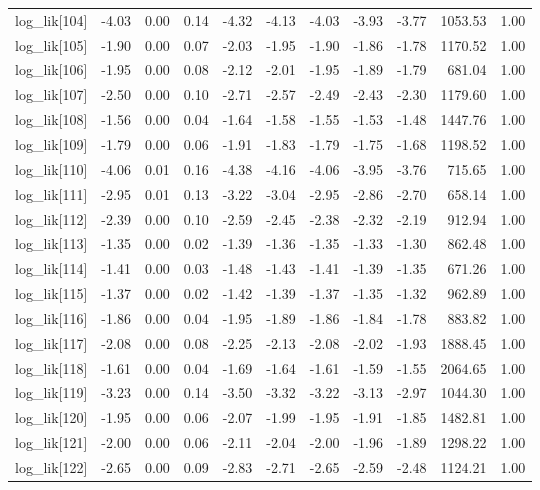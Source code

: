 \begin{table}[ht]
\begin{tabular}{rrrrrrrrrrr}
  log\_lik[104] & -4.03 & 0.00 & 0.14 & -4.32 & -4.13 & -4.03 & -3.93 & -3.77 & 1053.53 & 1.00 \\ 
  log\_lik[105] & -1.90 & 0.00 & 0.07 & -2.03 & -1.95 & -1.90 & -1.86 & -1.78 & 1170.52 & 1.00 \\ 
  log\_lik[106] & -1.95 & 0.00 & 0.08 & -2.12 & -2.01 & -1.95 & -1.89 & -1.79 & 681.04 & 1.00 \\ 
  log\_lik[107] & -2.50 & 0.00 & 0.10 & -2.71 & -2.57 & -2.49 & -2.43 & -2.30 & 1179.60 & 1.00 \\ 
  log\_lik[108] & -1.56 & 0.00 & 0.04 & -1.64 & -1.58 & -1.55 & -1.53 & -1.48 & 1447.76 & 1.00 \\ 
  log\_lik[109] & -1.79 & 0.00 & 0.06 & -1.91 & -1.83 & -1.79 & -1.75 & -1.68 & 1198.52 & 1.00 \\ 
  log\_lik[110] & -4.06 & 0.01 & 0.16 & -4.38 & -4.16 & -4.06 & -3.95 & -3.76 & 715.65 & 1.00 \\ 
  log\_lik[111] & -2.95 & 0.01 & 0.13 & -3.22 & -3.04 & -2.95 & -2.86 & -2.70 & 658.14 & 1.00 \\ 
  log\_lik[112] & -2.39 & 0.00 & 0.10 & -2.59 & -2.45 & -2.38 & -2.32 & -2.19 & 912.94 & 1.00 \\ 
  log\_lik[113] & -1.35 & 0.00 & 0.02 & -1.39 & -1.36 & -1.35 & -1.33 & -1.30 & 862.48 & 1.00 \\ 
  log\_lik[114] & -1.41 & 0.00 & 0.03 & -1.48 & -1.43 & -1.41 & -1.39 & -1.35 & 671.26 & 1.00 \\ 
  log\_lik[115] & -1.37 & 0.00 & 0.02 & -1.42 & -1.39 & -1.37 & -1.35 & -1.32 & 962.89 & 1.00 \\ 
  log\_lik[116] & -1.86 & 0.00 & 0.04 & -1.95 & -1.89 & -1.86 & -1.84 & -1.78 & 883.82 & 1.00 \\ 
  log\_lik[117] & -2.08 & 0.00 & 0.08 & -2.25 & -2.13 & -2.08 & -2.02 & -1.93 & 1888.45 & 1.00 \\ 
  log\_lik[118] & -1.61 & 0.00 & 0.04 & -1.69 & -1.64 & -1.61 & -1.59 & -1.55 & 2064.65 & 1.00 \\ 
  log\_lik[119] & -3.23 & 0.00 & 0.14 & -3.50 & -3.32 & -3.22 & -3.13 & -2.97 & 1044.30 & 1.00 \\ 
  log\_lik[120] & -1.95 & 0.00 & 0.06 & -2.07 & -1.99 & -1.95 & -1.91 & -1.85 & 1482.81 & 1.00 \\ 
  log\_lik[121] & -2.00 & 0.00 & 0.06 & -2.11 & -2.04 & -2.00 & -1.96 & -1.89 & 1298.22 & 1.00 \\ 
  log\_lik[122] & -2.65 & 0.00 & 0.09 & -2.83 & -2.71 & -2.65 & -2.59 & -2.48 & 1124.21 & 1.00 \\ 

\end{tabular}
\end{table}
